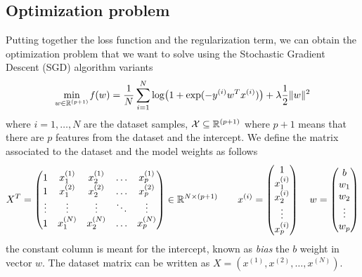 \subsection{Optimization problem}

Putting together the loss function and the regularization term, we can obtain the optimization problem that we want to solve using the Stochastic Gradient Descent (SGD) algorithm variants
\begin{equation}\label{eq:opt-prob}
\min_{w\in\mathbb{R}^{(p+1)}}\operatorname*{\mathit{f}}(w)=\frac{1}{N}\sum_{i=1}^N\log\bigl(1+\exp(-y^{(i)}w^Tx^{(i)})\bigr)+\lambda\frac{1}{2}\lVert w\rVert^2
\end{equation}
where $i=1,\dots,N$ are the dataset samples, $\mathcal{X}\subseteq\mathbb{R}^{(p+1)}$ where $p+1$ means that there are $p$ features from the dataset and the intercept. %
We define the matrix associated to the dataset and the model weights as follows
\[
X^T=
\begin{pmatrix}
1 & x_1^{(1)} & x_2^{(1)} & \dots & x_p^{(1)} \\
1 & x_1^{(2)} & x_2^{(2)} & \dots & x_p^{(2)} \\
\vdots & \vdots & \vdots & \ddots & \vdots \\
1 & x_1^{(N)} & x_2^{(N)} & \dots & x_p^{(N)}
\end{pmatrix}\in\mathbb{R}^{N\times(p+1)}\qquad
x^{(i)}=
\begin{pmatrix}
1 \\ x_1^{(i)} \\ x_2^{(i)} \\ \vdots \\ x_p^{(i)}
\end{pmatrix}\quad
w=
\begin{pmatrix}
b \\ w_1 \\ w_2 \\ \vdots \\ w_p
\end{pmatrix}
\]
the constant column is meant for the intercept, known as \emph{bias} the $b$ weight in vector $w$. The dataset matrix can be written as $X=(x^{(1)},x^{(2)},\dots,x^{(N)})$.%

